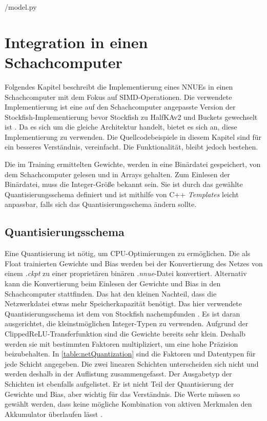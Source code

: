 
{\srcloc/model.py}

\section{Integration in einen Schachcomputer}
\label{chap:integration}

Folgendes Kapitel beschreibt die Implementierung eines \acp{NNUE} in einen Schachcomputer mit dem Fokus auf \ac{SIMD}-Operationen. Die verwendete Implementierung ist eine auf den Schachcomputer angepasste Version der Stockfish-Implementierung bevor Stockfish zu HalfKAv2 und Buckets gewechselt ist \cite{StockfishRepo}. Da es sich um die gleiche Architektur handelt, bietet es sich an, diese Implementierung zu verwenden. Die Quellcodebeispiele in diesem Kapitel sind für ein besseres Verständnis, vereinfacht. Die Funktionalität, bleibt jedoch bestehen.

Die im Training ermittelten Gewichte, werden in eine Binärdatei gespeichert, von dem Schachcomputer gelesen und in Arrays gehalten. Zum Einlesen der Binärdatei, muss die Integer-Größe bekannt sein. Sie ist durch das gewählte Quantisierungsschema definiert und ist mithilfe von C++ \emph{Templates} leicht anpassbar, falls sich das Quantisierungsschema ändern sollte.

\subsection{Quantisierungsschema}

Eine Quantisierung ist nötig, um CPU-Optimierungen zu ermöglichen. Die als Float trainierten Gewichte und Bias werden bei der Konvertierung des Netzes von einem \emph{.ckpt} zu einer proprietären binären \emph{.nnue}-Datei konvertiert. Alternativ kann die Konvertierung beim Einlesen der Gewichte und Bias in den Schachcomputer stattfinden. Das hat den kleinen Nachteil, dass die Netzwerkdatei etwas mehr Speicherkapazität benötigt. Das hier verwendete Quantisierungsschema ist dem von Stockfish nachempfunden \cite{StockfishNNUE}. Es ist daran ausgerichtet, die kleinstmöglichen Integer-Typen zu verwenden. Aufgrund der Clipped\ac{ReLU}-Transferfunktion sind die Gewichte bereits sehr klein. Deshalb werden sie mit bestimmten Faktoren multipliziert, um eine hohe Präzision beizubehalten. In \autoref{table:netQuantization} sind die Faktoren und Datentypen für jede Schicht angegeben. Die zwei linearen Schichten unterscheiden sich nicht und werden deshalb in der Auflistung zusammengefasst. Der Ausgabetyp der Schichten ist ebenfalls aufgelistet. Er ist nicht Teil der Quantisierung der Gewichte und Bias, aber wichtig für das Verständnis. Die Werte müssen so gewählt werden, dass keine mögliche Kombination von aktiven Merkmalen den Akkumulator überlaufen lässt \cite{StockfishNNUE}.

